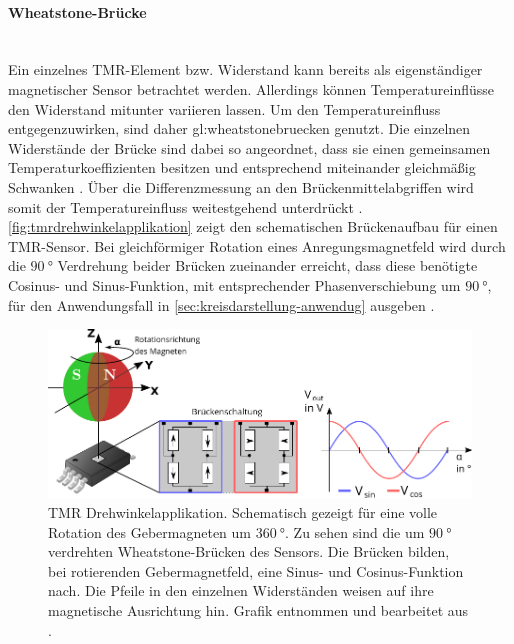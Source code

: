 \clearpage

\paragraph{Wheatstone-Brücke}\label{par:wheatstone-bruecke}$~$\\


Ein einzelnes TMR-Element bzw. Widerstand kann bereits als eigenständiger magnetischer Sensor betrachtet werden. Allerdings können Temperatureinflüsse den Widerstand mitunter variieren lassen. Um den Temperatureinfluss entgegenzuwirken, sind daher \gls{gl:wheatstonebruecken} genutzt. Die einzelnen Widerstände der Brücke sind dabei so angeordnet, dass sie einen gemeinsamen Temperaturkoeffizienten besitzen und entsprechend miteinander gleichmäßig Schwanken \cite{Tille2020}. Über die Differenzmessung an den Brückenmittelabgriffen wird somit der Temperatureinfluss weitestgehend unterdrückt \cite{TDK2016}\cite{Tille2020}. \autoref{fig:tmrdrehwinkelapplikation} zeigt den schematischen Brückenaufbau für einen TMR-Sensor. Bei gleichförmiger Rotation eines Anregungsmagnetfeld wird durch die $\SI{90}{\degree}$ Verdrehung beider Brücken zueinander erreicht, dass diese benötigte Cosinus- und Sinus-Funktion, mit entsprechender Phasenverschiebung um $\SI{90}{\degree}$, für den Anwendungsfall in \autoref{sec:kreisdarstellung-anwendug} ausgeben \cite{TDK2016}. 


\vspace{5mm}
\begin{figure}[tbph]
	\centering
	\includegraphics[width=\linewidth]{chapters/images/2-Grundlagen/TMR_Drehwinkelapplikation}
	\caption[TMR Drehwinkelapplikation]{TMR Drehwinkelapplikation. Schematisch gezeigt für eine volle Rotation des 
		Gebermagneten um $\SI{360}{\degree}$. Zu sehen sind die um $\SI{90}{\degree}$ verdrehten Wheatstone-Brücken des 
		Sensors. Die Brücken bilden, bei rotierenden Gebermagnetfeld, eine Sinus- und Cosinus-Funktion nach. Die Pfeile in 
		den einzelnen Widerständen weisen auf ihre magnetische Ausrichtung hin. Grafik entnommen und bearbeitet aus 
		\cite{Schuethe2020a}.}
	\label{fig:tmrdrehwinkelapplikation}
\end{figure}
